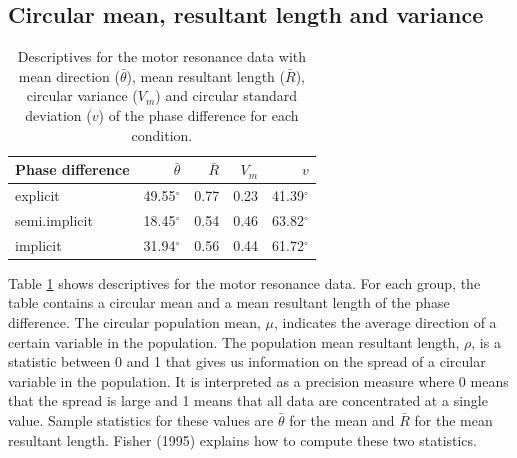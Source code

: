 \documentclass[11pt,]{article}
\begin{document}
\subsection{Circular mean, resultant length and variance}\label{MeanVariance}

\begin{table}
\centering
\caption{Descriptives for the motor resonance data with mean direction ($\bar{\theta}$), mean resultant length ($\bar{R}$), circular variance ($V_m$) and circular standard deviation ($v$) of the phase difference for each condition.} 
\begin{tabular}{lrrrr}
  \hline\noalign{\smallskip}
Phase difference & $\bar{\theta}$ & $\bar{R}$ & $V_m$ & $v$ \\ \hline\noalign{\smallskip}
explicit         & 49.55$^{\circ}$ & 0.77 & 0.23 & 41.39$^{\circ}$\\ 
semi.implicit    & 18.45$^{\circ}$ & 0.54 & 0.46 & 63.82$^{\circ}$\\
implicit         & 31.94$^{\circ}$ & 0.56 & 0.44 & 61.72$^{\circ}$\\
   \hline
\end{tabular}
\label{TableDescriptives}
\end{table}

Table \ref{TableDescriptives} shows descriptives for the motor resonance
data. For each group, the table contains a circular mean and a mean
resultant length of the phase difference. The circular population mean,
\(\mu\), indicates the average direction of a certain variable in the
population. The population mean resultant length, \(\rho\), is a
statistic between 0 and 1 that gives us information on the spread of a
circular variable in the population. It is interpreted as a precision
measure where 0 means that the spread is large and 1 means that all data
are concentrated at a single value. Sample statistics for these values
are \(\bar{\theta}\) for the mean and \(\bar{R}\) for the mean resultant
length. Fisher (1995) explains how to compute these two statistics.
\end{document}
